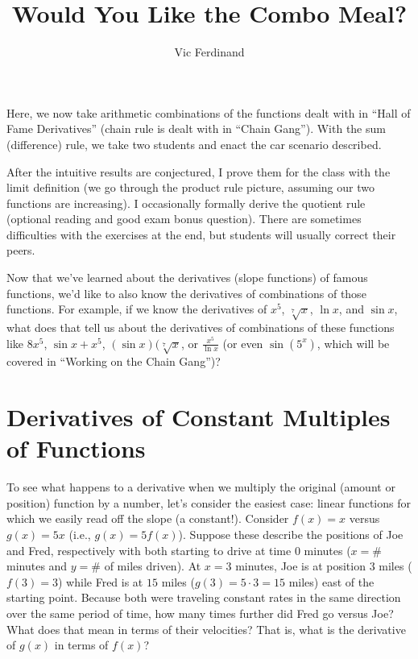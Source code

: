 \documentclass{ximera}
\author{Vic Ferdinand}
\title{Would You Like the Combo Meal?}
\begin{document}
\begin{abstract}
\end{abstract}
\maketitle

\begin{instructorIntro}
Here, we now take arithmetic combinations of the functions dealt with in ``Hall of Fame Derivatives'' (chain rule is dealt with in ``Chain Gang'').  With the sum (difference) rule, we take two students and enact the car scenario described. 

After the intuitive results are conjectured, I prove them for the class with the limit definition (we go through the product rule picture, assuming our two functions are increasing).  I occasionally formally derive the quotient rule (optional reading and good exam bonus question).
There are sometimes difficulties with the exercises at the end, but students will usually correct their peers.

\end{instructorIntro}

Now that we've learned about the derivatives (slope functions) of famous functions, we'd like to also know the derivatives of combinations of those functions.  For example, if we know the derivatives of  $x^5$,  $\sqrt[7]{x}$,  $\ln x$, and  $\sin x$, what does that tell us about the derivatives of combinations of these functions like  $8x^5$,  $\sin x + x^5$, $(\sin x)(\sqrt[7]{x}$, or $\frac{x^5}{\ln x}$  (or even  $\sin(5^x)$, which will be covered in ``Working on the Chain Gang'')?

\section*{Derivatives of Constant Multiples of Functions}

To see what happens to a derivative when we multiply the original (amount or position) function by a number, let's consider the easiest case: linear functions for which we easily read off the slope (a constant!).  Consider $f(x) = x$ versus $g(x) = 5x$  (i.e.,  $g(x) = 5f(x)$).  Suppose these describe the positions of Joe and Fred, respectively with both starting to drive at time $0$ minutes ($x=\#$ minutes and $y = \#$ of miles driven).  At $x=3$ minutes, Joe is at position $3$ miles ($f(3)=3$) while Fred is at $15$ miles ($g(3)=5\cdot 3=15$ miles) east of the starting point.  Because both were traveling constant rates in the same direction over the same period of time, how many times further did Fred go versus Joe?  What does that mean in terms of their velocities? That is, what is the derivative of $g(x)$ in terms of $f(x)$?
\end{document}
